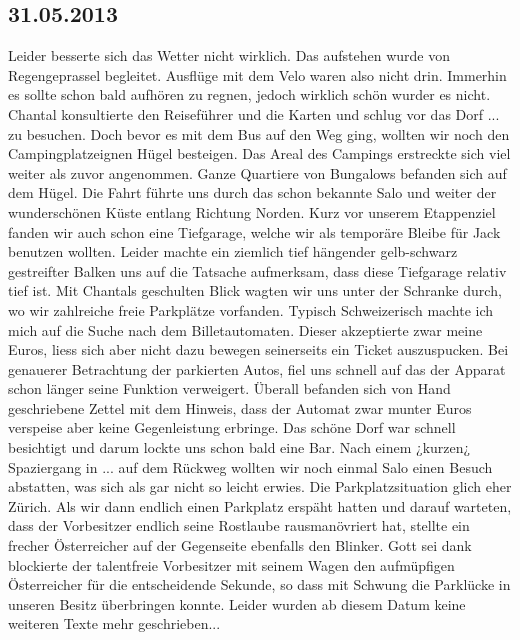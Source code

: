 \subsection{31.05.2013}
Leider besserte sich das Wetter nicht wirklich.
Das aufstehen wurde von Regengeprassel begleitet.
Ausflüge mit dem Velo waren also nicht drin.
Immerhin es sollte schon bald aufhören zu regnen, jedoch wirklich schön wurder es nicht.
Chantal konsultierte den Reiseführer und die Karten und schlug vor das Dorf ... zu besuchen.
Doch bevor es mit dem Bus auf den Weg ging, wollten wir noch den Campingplatzeignen Hügel besteigen.
Das Areal des Campings erstreckte sich viel weiter als zuvor angenommen.
Ganze Quartiere von Bungalows befanden sich auf dem Hügel.
Die Fahrt führte uns durch das schon bekannte Salo und weiter der wunderschönen Küste entlang Richtung Norden.
Kurz vor unserem Etappenziel fanden wir auch schon eine Tiefgarage, welche wir als temporäre Bleibe für Jack benutzen wollten.
Leider machte ein ziemlich tief hängender gelb-schwarz gestreifter Balken uns auf die Tatsache aufmerksam, dass diese Tiefgarage relativ tief ist.
Mit Chantals geschulten Blick wagten wir uns unter der Schranke durch, wo wir zahlreiche freie Parkplätze vorfanden.
Typisch Schweizerisch machte ich mich auf die Suche nach dem Billetautomaten.
Dieser akzeptierte zwar meine Euros, liess sich aber nicht dazu bewegen seinerseits ein Ticket auszuspucken.
Bei genauerer Betrachtung der parkierten Autos, fiel uns schnell auf das der Apparat schon länger seine Funktion verweigert.
Überall befanden sich von Hand geschriebene Zettel mit dem Hinweis, dass der Automat zwar munter Euros verspeise aber keine Gegenleistung erbringe.
Das schöne Dorf war schnell besichtigt und darum lockte uns schon bald eine Bar.
Nach einem ¿kurzen¿ Spaziergang in ...
auf dem Rückweg wollten wir noch einmal Salo einen Besuch abstatten, was sich als gar nicht so leicht erwies.
Die Parkplatzsituation glich eher Zürich.
Als wir dann endlich einen Parkplatz erspäht hatten und darauf warteten, dass der Vorbesitzer endlich seine Rostlaube rausmanövriert hat, stellte ein frecher Österreicher auf der Gegenseite ebenfalls den Blinker.
Gott sei dank blockierte der talentfreie Vorbesitzer mit seinem Wagen den aufmüpfigen Österreicher für die entscheidende Sekunde, so dass mit Schwung die Parklücke in unseren Besitz überbringen konnte.
Leider wurden ab diesem Datum keine weiteren Texte mehr geschrieben... 
